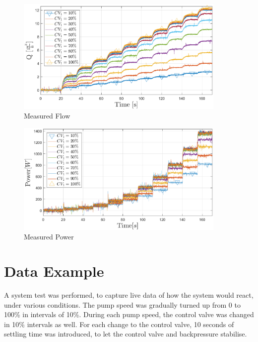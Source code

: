 \begin{figure}[ht]
	\centering
	\includegraphics[width=0.9\textwidth]{figures/05mathematicalModelling/measuredFlow.eps}
	\caption{Measured Flow}
	\label{fig:measuredFlow}
\end{figure}
\vspace{-5mm}
\begin{figure}[ht]
	\centering
	\includegraphics[width=0.9\textwidth]{figures/05mathematicalModelling/measuredPower.eps}
	\caption{Measured Power}
	\label{fig:measuredPower}
\end{figure}


\section{Data Example}\label{sec:results}
A system test was performed, 
to capture live data of how the system would react, 
under various conditions.
The pump speed was gradually turned up from 0 to 100\% in intervals of 10\%. 
During each pump speed, the control valve was changed in 10\% intervals as well. 
For each change to the control valve, 
10 seconds of settling time was introduced, 
to let the control valve and backpressure stabilise.

